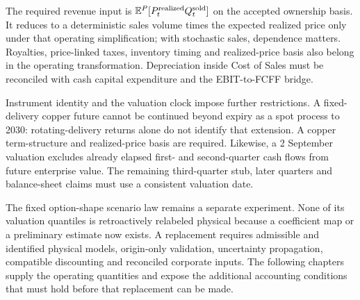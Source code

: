 The required revenue input is $\mathbb E^P[P_t^{\rm realized}Q_t^{\rm sold}]$
on the accepted ownership basis. It reduces to a deterministic sales volume
times the expected realized price only under that operating simplification;
with stochastic sales, dependence matters. Royalties, price-linked taxes,
inventory timing and realized-price basis also belong in the operating
transformation. Depreciation inside Cost of Sales must be reconciled with
cash capital expenditure and the EBIT-to-FCFF bridge.

Instrument identity and the valuation clock impose further restrictions. A
fixed-delivery copper future cannot be continued beyond expiry as a spot
process to 2030: rotating-delivery returns alone do not identify that extension.
A copper term-structure and realized-price basis are required. Likewise, a
2 September valuation excludes already elapsed first- and second-quarter cash
flows from future enterprise value. The remaining third-quarter stub, later
quarters and balance-sheet claims must use a consistent valuation date.

The fixed option-shape scenario law remains a separate experiment. None of
its valuation quantiles is retroactively relabeled physical because a
coefficient map or a preliminary estimate now exists. A replacement requires
admissible and identified physical models, origin-only validation, uncertainty
propagation, compatible discounting and reconciled corporate inputs. The
following chapters supply the operating quantities and expose the additional
accounting conditions that must hold before that replacement can be made.
